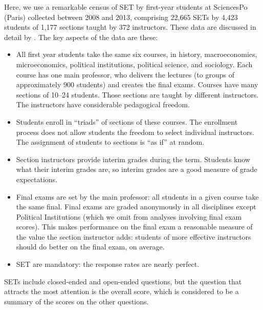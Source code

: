 \documentclass[12pt]{article}
\begin{document}
Here, we use a remarkable census of SET by first-year students at SciencesPo (Paris)
collected between 2008 and 2013, 
comprising 22,665 SETs by
4,423 students of 1,177
sections taught by 372 instructors.
These data are discussed in detail by \citet{boring15}.
The key aspects of the data are these:
\begin{itemize}
   \item All first year students take the same six courses, in history, macroeconomics, microeconomics, 
            political institutions, political science, and sociology.
            Each course has one main professor,
            who delivers the lectures (to groups of approximately 900 students) and creates 
            the final exams.
            Courses have many sections of 10--24 students. 
            Those sections are taught by different instructors.
            The instructors have considerable pedagogical freedom.
    
   \item Students enroll in ``triads'' of sections of these courses. 
            The enrollment process
            does not allow students the freedom to select individual instructors.
            The assignment of students to sections is ``as if'' at random.
            
   \item Section instructors provide interim grades during the term. 
            Students know what their interim grades are, so interim grades are a 
            good measure of grade expectations.
            
   \item Final exams are set by the main professor: all students in a given course take the
            same final. Final exams are graded anonymously in all disciplines except Political
            Institutions (which we omit from analyses involving final exam scores).
            This makes performance on the final exam a reasonable measure of the value the
            section instructor adds: students of more effective instructors should do better on
            the final exam, on average.
    
   \item SET are mandatory: the response rates are nearly perfect.
   
\end{itemize}

SETs include closed-ended and open-ended questions, 
but the question that attracts the most attention is the overall 
score, which is considered to be a summary 
of the scores on the other questions. 
\end{document}
